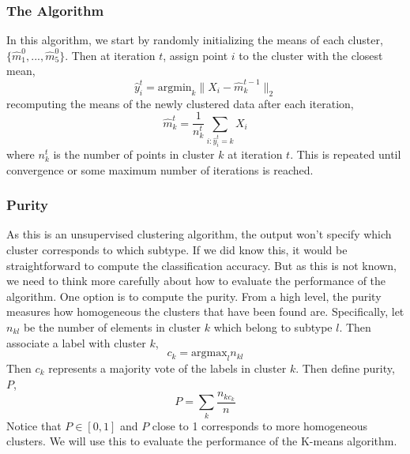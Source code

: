 \documentclass{article}
\begin{document}
\subsubsection{The Algorithm}
In this algorithm, we start by randomly initializing the means of each cluster, $\{\hat{m}^0_1, ..., \hat{m}^0_5\}$. Then at iteration $t$, assign point $i$ to the cluster with the closest mean,
\[ \hat{y}_i^t = \mbox{argmin}_k \|X_i - \hat{m}^{t-1}_k\|_2 \]
recomputing the means of the newly clustered data after each iteration,
\[ \hat{m}^t_k = \frac{1}{n^t_k}\sum\limits_{i: \hat{y}_i^t = k} X_i \]
where $n_k^t$ is the number of points in cluster $k$ at iteration $t$. This is repeated until convergence or some maximum number of iterations is reached.
\subsubsection{Purity}
As this is an unsupervised clustering algorithm, the output won't specify which cluster corresponds to which subtype. If we did know this, it would be straightforward to compute the classification accuracy. But as this is not known, we need to think more carefully about how to evaluate the performance of the algorithm.
\newline\newline One option is to compute the purity. From a high level, the purity measures how homogeneous the clusters that have been found are. Specifically, let $n_{kl}$ be the number of elements in cluster $k$ which belong to subtype $l$. Then associate a label with cluster $k$,
\[ c_k = \mbox{argmax}_l n_{kl} \]
Then $c_k$ represents a majority vote of the labels in cluster $k$. Then define purity, $P$,
\[ P = \sum\limits_{k} \frac{n_{kc_k}}{n} \]
Notice that $P \in [0,1]$ and $P$ close to 1 corresponds to more homogeneous clusters. We will use this to evaluate the performance of the K-means algorithm.
\end{document}
